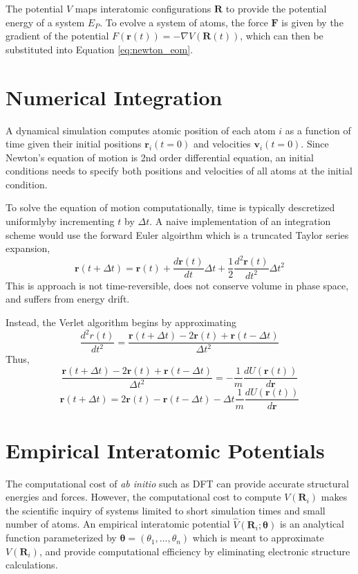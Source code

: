 The potential $V$ maps interatomic configurations $\bm{R}$ to provide the potential energy of a system $E_P$.  To evolve a system of atoms, the force $\bm{F}$ is given by the gradient of the potential $F(\bm{r}(t))=-\nabla V(\bm{R}(t))$, which can then be substituted into Equation \ref{eq:newton_eom}.


\section{Numerical Integration}
A dynamical simulation computes atomic position of each atom $i$ as a function of time given their initial positions $\bm{r}_i(t=0)$ and velocities $\bm{v}_i(t=0)$.  Since Newton's equation of motion is 2nd order differential equation, an initial conditions needs to specify both positions and velocities of all atoms at the initial condition.

To solve the equation of motion computationally, time is typically descretized uniformlyby incrementing $t$ by $\Delta t$.  A naive implementation of an integration scheme would use the forward Euler algoirthm which is a truncated Taylor series expansion,
\begin{equation}
	\bm{r}(t+\Delta t)
	=
	\bm{r}(t)
	+ \frac{d \bm{r}(t)}{dt} \Delta t
	+ \frac{1}{2} \frac{d^2 \bm{r}(t)}{dt^2} \Delta t^2
\end{equation}
This is approach is not time-reversible, does not conserve volume in phase space, and suffers from energy drift\cite{allen1987_md}.

Instead, the Verlet algorithm begins by approximating
\begin{equation}
	\frac{d^2 r(t)}
	     {dt^2}
	= \frac{\bm{r}(t+\Delta t) - 2\bm{r}(t) + \bm{r}(t-\Delta t)}
	       {\Delta t^2}
\end{equation}
Thus,
\begin{equation}
  \frac{\bm{r}(t+\Delta t) - 2\bm{r}(t) + \bm{r}(t-\Delta t)}
	     {\Delta t^2}
	=
	- \frac{1}{m} \frac{dU(\bm{r}(t))}{d\bm{r}}
\end{equation}
\begin{equation}
	\bm{r}(t+\Delta t)
	     = 2\bm{r}(t) - \bm{r}(t-\Delta t) - \Delta t \frac{1}{m} \frac{dU(\bm{r}(t))}{d\bm{r}}
\end{equation}

\section{Empirical Interatomic Potentials}
The computational cost of \emph{ab initio} such as DFT can provide accurate structural energies and forces.  However, the computational cost to compute $V(\bm{R}_i)$  makes the scientific inquiry of systems limited to short simulation times and small number of atoms.
An empirical interatomic potential $\hat{V}(\bm{R}_i;\bm{\theta})$ is an analytical function parameterized by $\bm{\theta}=(\theta_1,...,\theta_n)$ which is meant to approximate $V(\bm{R}_i)$, and provide computational efficiency by eliminating electronic structure calculations.

